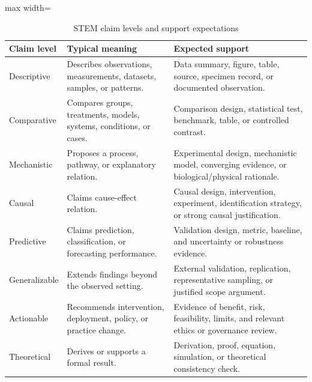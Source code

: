 \documentclass[12pt]{article}
\begin{document}
\begin{table}[htbp]
\centering
\caption{STEM claim levels and support expectations}
\begin{adjustbox}{max width=\textwidth}
\begin{tabularx}{\textwidth}{p{}X X}
\toprule
\textbf{Claim level} & \textbf{Typical meaning} & \textbf{Expected support} \\
\midrule
Descriptive & Describes observations, measurements, datasets, samples, or patterns. & Data summary, figure, table, source, specimen record, or documented observation. \\
Comparative & Compares groups, treatments, models, systems, conditions, or cases. & Comparison design, statistical test, benchmark, table, or controlled contrast. \\
Mechanistic & Proposes a process, pathway, or explanatory relation. & Experimental design, mechanistic model, converging evidence, or biological/physical rationale. \\
Causal & Claims cause-effect relation. & Causal design, intervention, experiment, identification strategy, or strong causal justification. \\
Predictive & Claims prediction, classification, or forecasting performance. & Validation design, metric, baseline, and uncertainty or robustness evidence. \\
Generalizable & Extends findings beyond the observed setting. & External validation, replication, representative sampling, or justified scope argument. \\
Actionable & Recommends intervention, deployment, policy, or practice change. & Evidence of benefit, risk, feasibility, limits, and relevant ethics or governance review. \\
Theoretical & Derives or supports a formal result. & Derivation, proof, equation, simulation, or theoretical consistency check. \\
\bottomrule
\end{tabularx}
\end{adjustbox}
\end{table}
\end{document}
